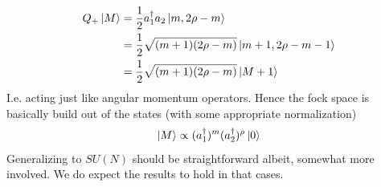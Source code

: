 \documentclass[a4paper,12pt]{article}
\begin{document}
\begin{equation}
	\begin{aligned}
		Q_+\ket{M}&=\frac{1}{2}a_1^\dagger a_2\ket{m,2\rho-m}\\&=\frac{1}{2}\sqrt{(m+1)(2\rho-m)}\ket{m+1,2\rho-m-1}\\
		&=\frac{1}{2}\sqrt{(m+1)(2\rho-m)}\ket{M+1}
	\end{aligned}
\end{equation}
I.e. acting just like angular momentum operators. Hence the fock space is basically build out of the states (with some appropriate normalization)
\begin{equation}
	\begin{aligned}
		\ket{M}\propto(a_1^\dagger)^{m} (a_2^\dagger) ^{\rho}\ket{0}
	\end{aligned}
\end{equation}
Generalizing to $SU(N)$ should be straightforward albeit, somewhat more involved. We do expect the results to hold in that cases.
\end{document}
